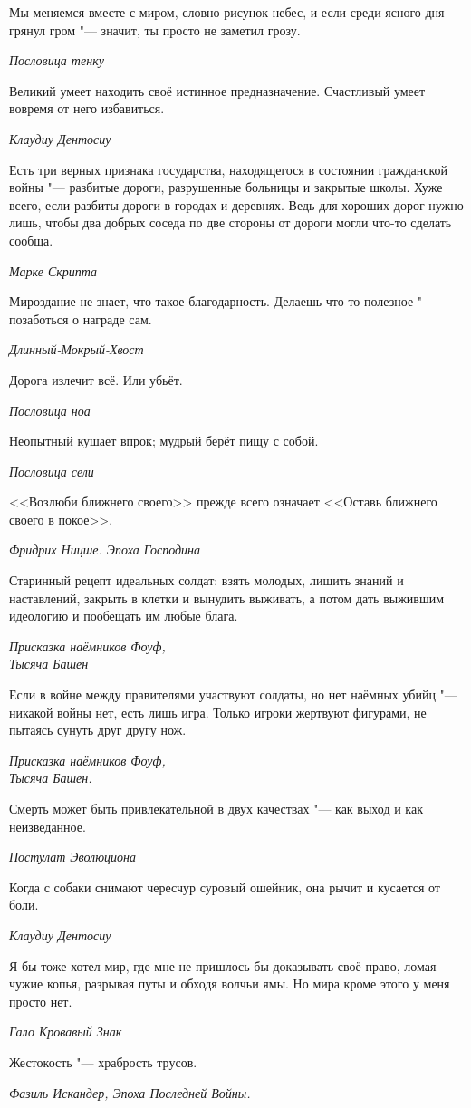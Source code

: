 \documentclass[a4paper,10pt,fleqn]{book}
\begin{document}
\epigraph{Мы меняемся вместе с миром, словно рисунок небес, и если среди ясного дня грянул гром "--- значит, ты просто не заметил грозу.}
{\textit{Пословица тенку}}

\epigraph{Великий умеет находить своё истинное предназначение.
Счастливый умеет вовремя от него избавиться.}
{\textit{Клаудиу Дентосиу}}

\epigraph{Есть три верных признака государства, находящегося в состоянии гражданской войны "--- разбитые дороги, разрушенные больницы и закрытые школы.
Хуже всего, если разбиты дороги в городах и деревнях.
Ведь для хороших дорог нужно лишь, чтобы два добрых соседа по две стороны от дороги могли что-то сделать сообща.}
{\textit{Марке Скрипта}}

\epigraph{Мироздание не знает, что такое благодарность.
Делаешь что-то полезное "--- позаботься о награде сам.}
{\textit{Длинный-Мокрый-Хвост}}

\epigraph{Дорога излечит всё.
Или убьёт.}
{\textit{Пословица ноа}}

\epigraph{Неопытный кушает впрок;
мудрый берёт пищу с собой.}
{\textit{Пословица сели}}

\epigraph{<<Возлюби ближнего своего>> прежде всего означает <<Оставь ближнего своего в покое>>.}
{\textit{Фридрих Ницше. Эпоха Господина}}

\epigraph{Старинный рецепт идеальных солдат: взять молодых, лишить знаний и наставлений, закрыть в клетки и вынудить выживать, а потом дать выжившим идеологию и пообещать им любые блага.}
{\textit{Присказка наёмников Фоуф,\\Тысяча Башен}}

\epigraph{Если в войне между правителями участвуют солдаты, но нет наёмных убийц "--- никакой войны нет, есть лишь игра.
Только игроки жертвуют фигурами, не пытаясь сунуть друг другу нож.}
{\textit{Присказка наёмников Фоуф,\\Тысяча Башен.}}

\epigraph{Смерть может быть привлекательной в двух качествах "--- как выход и как неизведанное.}
{\textit{Постулат Эволюциона}}

\epigraph{Когда с собаки снимают чересчур суровый ошейник, она рычит и кусается от боли.}
{\textit{Клаудиу Дентосиу}}

\epigraph{Я бы тоже хотел мир, где мне не пришлось бы доказывать своё право, ломая чужие копья, разрывая путы и обходя волчьи ямы.
Но мира кроме этого у меня просто нет.}
{\textit{Гало Кровавый Знак}}

\epigraph{Жестокость "--- храбрость трусов.}
{\textit{Фазиль Искандер, Эпоха Последней Войны.}}
\end{document}
